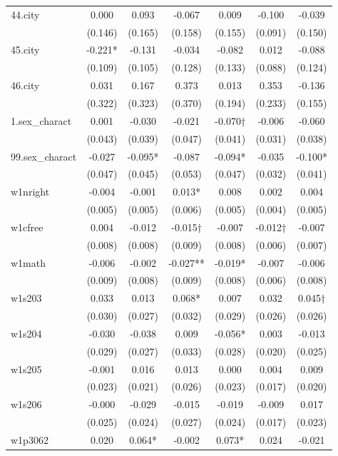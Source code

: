 \documentclass[]{article}
\begin{document}
\begin{tabular}{lcccccc}
44.city & 0.000 & 0.093 & -0.067 & 0.009 & -0.100 & -0.039 \\
 & (0.146) & (0.165) & (0.158) & (0.155) & (0.091) & (0.150) \\
45.city & -0.221* & -0.131 & -0.034 & -0.082 & 0.012 & -0.088 \\
 & (0.109) & (0.105) & (0.128) & (0.133) & (0.088) & (0.124) \\
46.city & 0.031 & 0.167 & 0.373 & 0.013 & 0.353 & -0.136 \\
 & (0.322) & (0.323) & (0.370) & (0.194) & (0.233) & (0.155) \\
1.sex\_charact & 0.001 & -0.030 & -0.021 & -0.070† & -0.006 & -0.060 \\
 & (0.043) & (0.039) & (0.047) & (0.041) & (0.031) & (0.038) \\
99.sex\_charact & -0.027 & -0.095* & -0.087 & -0.094* & -0.035 & -0.100* \\
 & (0.047) & (0.045) & (0.053) & (0.047) & (0.032) & (0.041) \\
w1nright & -0.004 & -0.001 & 0.013* & 0.008 & 0.002 & 0.004 \\
 & (0.005) & (0.005) & (0.006) & (0.005) & (0.004) & (0.005) \\
w1cfree & 0.004 & -0.012 & -0.015† & -0.007 & -0.012† & -0.007 \\
 & (0.008) & (0.008) & (0.009) & (0.008) & (0.006) & (0.007) \\
w1math & -0.006 & -0.002 & -0.027** & -0.019* & -0.007 & -0.006 \\
 & (0.009) & (0.008) & (0.009) & (0.008) & (0.006) & (0.008) \\
w1s203 & 0.033 & 0.013 & 0.068* & 0.007 & 0.032 & 0.045† \\
 & (0.030) & (0.027) & (0.032) & (0.029) & (0.026) & (0.026) \\
w1s204 & -0.030 & -0.038 & 0.009 & -0.056* & 0.003 & -0.013 \\
 & (0.029) & (0.027) & (0.033) & (0.028) & (0.020) & (0.025) \\
w1s205 & -0.001 & 0.016 & 0.013 & 0.000 & 0.004 & 0.009 \\
 & (0.023) & (0.021) & (0.026) & (0.023) & (0.017) & (0.020) \\
w1s206 & -0.000 & -0.029 & -0.015 & -0.019 & -0.009 & 0.017 \\
 & (0.025) & (0.024) & (0.027) & (0.024) & (0.017) & (0.023) \\
w1p3062 & 0.020 & 0.064* & -0.002 & 0.073* & 0.024 & -0.021 \\

\end{tabular}
\end{document}
